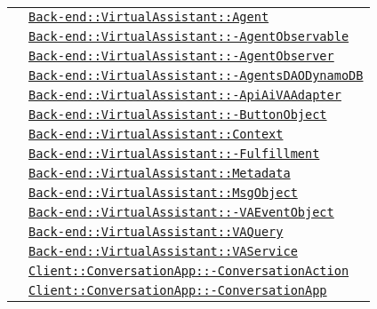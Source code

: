 \begin{longtable}{|>{\centering}m{3cm}|m{10cm}<{\centering}|}
& \hyperref[Back-end::VirtualAssistant::Agent]{\texttt{Back-end::VirtualAssistant::Agent}}\\
& \hyperref[Back-end::VirtualAssistant::AgentObservable]{\texttt{Back-end::VirtualAssistant::-\linebreak AgentObservable}}\\
& \hyperref[Back-end::VirtualAssistant::AgentObserver]{\texttt{Back-end::VirtualAssistant::-\linebreak AgentObserver}}\\
& \hyperref[Back-end::VirtualAssistant::AgentsDAODynamoDB]{\texttt{Back-end::VirtualAssistant::-\linebreak AgentsDAODynamoDB}}\\
& \hyperref[Back-end::VirtualAssistant::ApiAiVAAdapter]{\texttt{Back-end::VirtualAssistant::-\linebreak ApiAiVAAdapter}}\\
& \hyperref[Back-end::VirtualAssistant::ButtonObject]{\texttt{Back-end::VirtualAssistant::-\linebreak ButtonObject}}\\
& \hyperref[Back-end::VirtualAssistant::Context]{\texttt{Back-end::VirtualAssistant::Context}}\\
& \hyperref[Back-end::VirtualAssistant::Fulfillment]{\texttt{Back-end::VirtualAssistant::-\linebreak Fulfillment}}\\
& \hyperref[Back-end::VirtualAssistant::Metadata]{\texttt{Back-end::VirtualAssistant::Metadata}}\\
& \hyperref[Back-end::VirtualAssistant::MsgObject]{\texttt{Back-end::VirtualAssistant::MsgObject}}\\
& \hyperref[Back-end::VirtualAssistant::VAEventObject]{\texttt{Back-end::VirtualAssistant::-\linebreak VAEventObject}}\\
& \hyperref[Back-end::VirtualAssistant::VAQuery]{\texttt{Back-end::VirtualAssistant::VAQuery}}\\
& \hyperref[Back-end::VirtualAssistant::VAService]{\texttt{Back-end::VirtualAssistant::VAService}}\\
& \hyperref[Client::ConversationApp::ConversationAction]{\texttt{Client::ConversationApp::-\linebreak ConversationAction}}\\
& \hyperref[Client::ConversationApp::ConversationApp]{\texttt{Client::ConversationApp::-\linebreak ConversationApp}}\\

\end{longtable}
